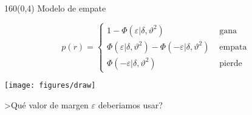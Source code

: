 \documentclass[shownotes,aspectratio=169]{beamer}
\begin{document}
\begin{frame}[plain]
 \begin{textblock}{160}(0,4)
  \centering \Large Modelo de empate
 \end{textblock}
\vspace{1.25cm}
 
 \begin{equation*}
  p(r) = 
  \begin{cases}
   1 - \Phi(\varepsilon| \delta, \vartheta^2) & \text{ gana } \\
   \Phi(\varepsilon| \delta, \vartheta^2) - \Phi(-\varepsilon| \delta, \vartheta^2) & \text{ empata } \\
   \Phi(-\varepsilon| \delta, \vartheta^2) & \text{ pierde }
  \end{cases}
 \end{equation*}

 \vspace{0.5cm}

 \centering
\texttt{[image: figures/draw]}

 
\end{frame}

\begin{frame}[plain]
 \centering \Large \vspace{1cm}
 
 >Qu\'e valor de margen $\varepsilon$ deberiamos usar?

\end{frame}
\end{document}
